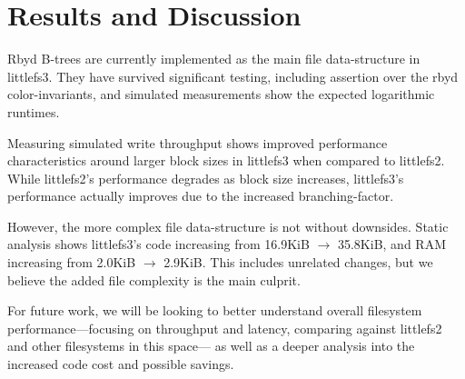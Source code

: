 \documentclass[letterpaper,twocolumn,10pt]{article}
\def\lfs+{littlefs}
\def\lfsiii+{avianfs}
\def\lfsiii+{littlefs3}
\def\lfsii+{littlefs2}
\begin{document}
\section{Results and Discussion}
\label{sec:results}
\label{sec:discussion}

Rbyd B-trees are currently implemented as
the main file data-structure in
\lfsiii+. They have survived significant testing, including assertion
over the rbyd color-invariants, and simulated measurements show the
expected logarithmic runtimes.

Measuring simulated
write throughput shows improved performance
characteristics around larger block sizes in \lfsiii+ when compared to
\lfsii+.
While \lfsii+'s performance degrades as block size increases, \lfsiii+'s
performance actually improves due to the increased branching-factor.

However, the more complex file data-structure is not without downsides.
Static analysis shows \lfsiii+'s code increasing from
16.9KiB {$\rightarrow$} 35.8KiB, and RAM increasing from
2.0KiB {$\rightarrow$} 2.9KiB.
This includes unrelated changes, but we believe the added file
complexity is the main culprit.

For future work, we will be looking to better understand overall
filesystem performance---focusing on throughput and latency, comparing 
against \lfsii+ and other filesystems in this space---%
as well as a deeper analysis into the increased code cost and possible
savings.



% 
% 
% 
% 
% 
% 
% 
% 
% 
% 
% 
% 
% 
% 
% 
\end{document}
